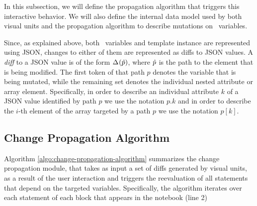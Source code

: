 In this subsection, we will define the propagation algorithm that triggers this interactive behavior. We will also define the internal data model used by both visual units and the propagation algorithm to describe mutations on \projname\ variables.


 Since, as explained above, both \projname\ variables and template instance are represented using JSON, changes to either of them are represented as diffs to JSON values. A \emph{diff} to a JSON value is of the form $\Delta^{}_{}(\hat{p})$, where $\hat{p}$ is the path to the element that is being modified. The first token of that path $p$ denotes the variable that is being mutated, while the remaining set denotes the individual nested attribute or array element. Specifically, in order to describe an individual attribute $k$ of a JSON value identified by path $p$ we use the notation $p.k$ and in order to describe the $i$-th element of the array targeted by a path $p$ we use the notation $p[k]$.

\subsection{Change Propagation Algorithm}
\label{section:change-propagation-algorithm}

Algorithm \ref{algo:change-propagation-algorithm} summarizes the change propagation module, that takes as input a set of diffs generated by visual units, as a result of the user interaction and triggers the reevaluation of all statements that depend on the targeted variables. Specifically, the algorithm iterates over each statement of each block that appears in the notebook (line 2)


